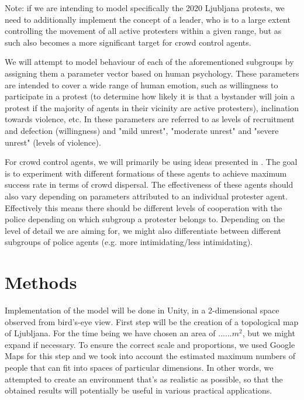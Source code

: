 \documentclass[9pt]{pnas-new}
\begin{document}
\bigskip
Note: if we are intending to model specifically the 2020 Ljubljana protests, we need to additionally implement the concept of a leader, who is to a large extent controlling the movement of all active protesters within a given range, but as such also becomes a more significant target for crowd control agents. 

\bigskip
We will attempt to model behaviour of each of the aforementioned subgroups by assigning them a parameter vector based on human psychology. These parameters are intended to cover a wide range of human emotion, such as willingness to participate in a protest (to determine how likely it is that a bystander will join a protest if the majority of agents in their vicinity are active protesters), inclination towards violence, etc. In \cite{sportsriots} these parameters are referred to as levels of recruitment and defection (willingness) and "mild unrest", "moderate unrest" and "severe unrest" (levels of violence). 


\bigskip
For crowd control agents, we will primarily be using ideas presented in \cite{crowdcontrol2}. The goal is to experiment with different formations of these agents to achieve maximum success rate in terms of crowd dispersal. The effectiveness of these agents should also vary depending on parameters attributed to an individual protester agent. Effectively this means there should be different levels of cooperation with the police depending on which subgroup a protester belongs to. Depending on the level of detail we are aiming for, we might also differentiate between different subgroups of police agents (e.g. more intimidating/less intimidating). 

\section*{Methods}

Implementation of the model will be done in Unity, in a 2-dimensional space observed from bird's-eye view. First step will be the creation of a topological map of Ljubljana. For the time being we have chosen an area of ......$m^2$, but we might expand if necessary. To ensure the correct scale and proportions, we used Google Maps for this step and we took into account the estimated maximum numbers of people that can fit into spaces of particular dimensions. In other words, we attempted to create an environment that's as realistic as possible, so that the obtained results will potentially be useful in various practical applications. 
\end{document}
